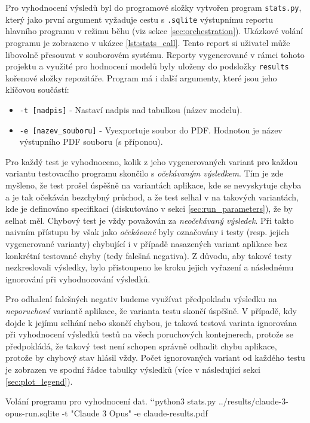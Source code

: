 \documentclass[czech, ma, kiv, he, iso690alph, pdf, viewonly]{fasthesis}
\begin{document}
        Pro vyhodnocení výsledů byl do programové složky vytvořen program \verb|stats.py|, který jako první argument vyžaduje cestu s \verb|.sqlite| výstupnímu reportu hlavního programu v režimu běhu (viz sekce \ref{sec:orchestration}). Ukázkové volání programu je zobrazeno v ukázce \ref{lst:stats_call}. Tento report si uživatel může libovolně přesouvat v souborovém systému. Reporty vygenerované v rámci tohoto projektu a využité pro hodnocení modelů byly uloženy do podsložky \verb|results| kořenové složky repozitáře. Program má i další argumenty, které jsou jeho klíčovou součástí:
        \begin{itemize}
            \item \verb|-t [nadpis]| - Nastaví nadpis nad tabulkou (název modelu).
            \item \verb|-e [nazev_souboru]| - Vyexportuje soubor do PDF. Hodnotou je název výstupního PDF souboru (s příponou).
        \end{itemize}
        Pro každý test je vyhodnoceno, kolik z jeho vygenerovaných variant pro každou variantu testovacího programu skončilo s \textit{očekávaným výsledkem}. Tím je zde myšleno, že test prošel úspěšně na variantách aplikace, kde se nevyskytuje chyba a je tak očekáván bezchybný průchod, a že test selhal v na takových variantách, kde je definováno specifikací (diskutováno v sekci \ref{sec:run_parameters}), že by selhat měl. Chybový test je vždy považován za \textit{neočekávaný výsledek}. Při takto naivním přístupu by však jako \emph{očekávané} byly označovány i testy (resp. jejich vygenerované varianty) chybující i v případě nasazených variant aplikace bez konkrétní testované chyby (tedy falešná negativa). Z důvodu, aby takové testy nezkreslovali výsledky, bylo přistoupeno ke kroku jejich vyřazení a následnému ignorování při vyhodnocování výsledků.

        Pro odhalení falešných negativ budeme využívat předpokladu výsledku na \emph{neporuchové} variantě aplikace, že varianta testu skončí úspěšně. V případě, kdy dojde k jejímu selhání nebo skončí chybou, je taková testová varinta ignorována při vyhodnocení výsledků testů na všech poruchových kontejnerech, protože se předpokládá, že takový test není schopen správně odhadit chybu aplikace, protože by chybový stav hlásil vždy. Počet ignorovaných variant od každého testu je zobrazen ve spodní řádce tabulky výsledků (více v následující sekci \ref{sec:plot_legend}).

        \begin{console}{Volání programu pro vyhodnocení dat. \label{lst:stats_call}}
`\uxprompt`python3 stats.py ../results/claude-3-opus-run.sqlite -t "Claude 3 Opus" -e claude-results.pdf
        \end{console}
\end{document}
